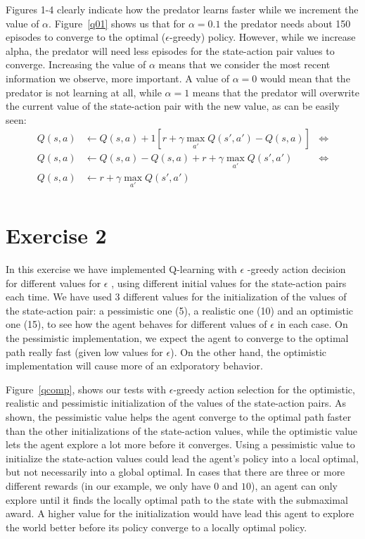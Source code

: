 \documentclass[a4paper,11pt]{article}
\begin{document}
Figures 1-4 clearly indicate how the predator learns faster while we increment the value of $\alpha$. Figure~\ref{q01} shows us that for $\alpha = 0.1$ the predator needs about 150 episodes to converge to the optimal ($\epsilon$-greedy) policy. However, while we increase alpha, the predator will need less episodes for the state-action pair values to converge. Increasing the value of $\alpha$ means that we consider the most recent information we observe, more important. A value of $\alpha = 0$ would mean that the predator is not learning at all, while $\alpha = 1$ means that the predator will overwrite the current value of the state-action pair with the new value, as can be easily seen:
\begin{align*}
  Q(s,a) &\leftarrow  Q(s,a) + 1 \left[ r + \gamma  \max_{a'} Q(s',a') - Q(s,a)\right] & \Longleftrightarrow\\
  Q(s,a) &\leftarrow  Q(s,a) - Q(s,a) + r + \gamma  \max_{a'} Q(s',a') & \Longleftrightarrow\\
  Q(s,a) &\leftarrow  r + \gamma  \max_{a'} Q(s',a') \\
\end{align*}
 
\section*{Exercise 2}

In this exercise we have implemented Q-learning with $\epsilon$ -greedy action decision for different values for $\epsilon$ , using different initial values for the state-action pairs each time. We have used 3 different values for the initialization of the values of the state-action pair: a pessimistic one (5), a realistic one (10) and an optimistic one (15), to see how the agent behaves for different values of $\epsilon$ in each case. On the pessimistic implementation, we expect the agent to converge to the optimal path really fast (given low values for $\epsilon$). On the other hand, the optimistic implementation will cause more of an exlporatory behavior.


Figure~\ref{qcomp}, shows our tests with $\epsilon$-greedy action selection for the optimistic, realistic and pessimistic initialization of the values of the state-action pairs. As shown, the pessimistic value helps the agent converge to the optimal path faster than the other initializations of the state-action values, while the optimistic value lets the agent explore a lot more before it converges. Using a pessimistic value to initialize the state-action values could lead the agent's policy into a local optimal, but not necessarily into a global optimal. In cases that there are three or more different rewards (in our example, we only have $0$ and $10$), an agent can only explore until it finds the locally optimal path to the state with the submaximal award. A higher value for the initialization would have lead this agent to explore the world better before its policy converge to a locally optimal policy. 
\end{document}
